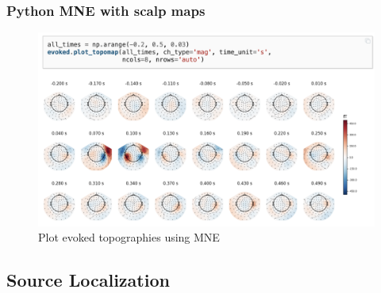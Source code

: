 \documentclass{beamer}
\begin{document}
\begin{frame}
\frametitle{Python MNE with scalp maps}
	\begin{figure}
		\includegraphics[width=0.8\linewidth]{image/scalp}
		\caption{Plot evoked topographies using MNE}
	\end{figure}
\end{frame}

\subsection{Source Localization}

%
\end{document}
